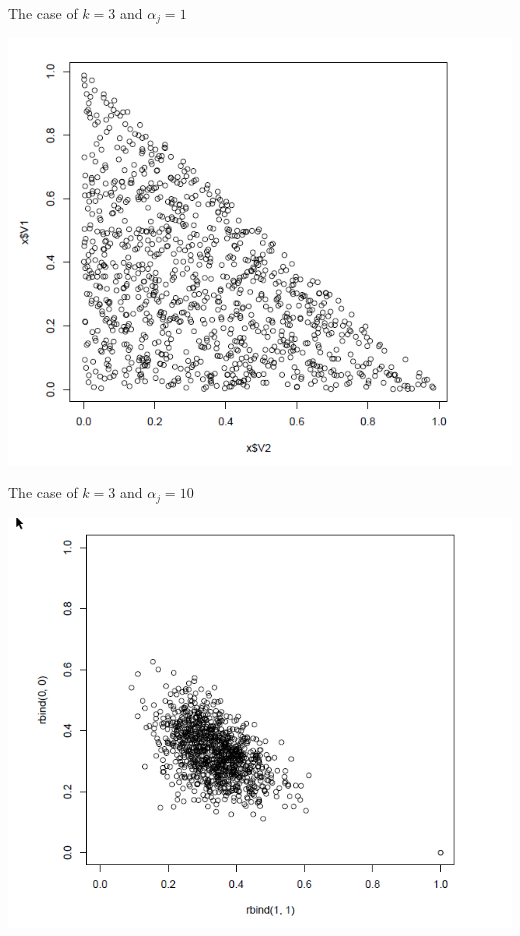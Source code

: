 \documentclass[english]{beamer}
\begin{document}
\begin{frame}{The case of $k=3$ and $\alpha_j = 1$}
\begin{center}
\includegraphics[scale=0.45]{Images/case3a.png}
\end{center}
\end{frame}
\begin{frame}{The case of $k=3$ and $\alpha_j = 10$}
\begin{center}
\includegraphics[scale=0.45]{Images/case3b.png}
\end{center}
\end{frame}
\end{document}
